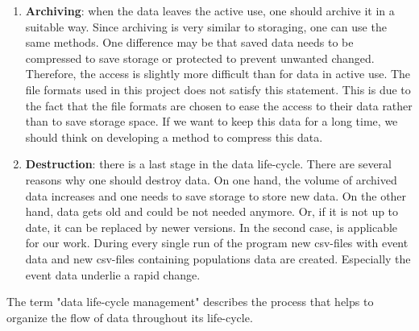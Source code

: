 \begin{enumerate}
	\item \textbf{Archiving}: when the data leaves the active use, one should archive it in a suitable way. Since archiving is very similar to storaging, one can use the same methods. One difference may be that saved data needs to be compressed to save storage or protected to prevent unwanted changed. Therefore, the access is slightly more difficult than for data in active use. The file formats used in this project does not satisfy this statement. This is due to the fact that the file formats are chosen to ease the access to their data rather than to save storage space. If we want to keep this data for a long time, we should think on developing a method to compress this data.
	\item \textbf{Destruction}:  there is a last stage in the data life-cycle. There are several reasons why one should destroy data. On one hand, the volume of archived data increases and one needs to save storage to store new data. On the other hand, data gets old and could be not needed anymore. Or, if it is not up to date, it can be replaced by newer versions. In the second case, is applicable for our work. During every single run of the program new csv-files with event data and new csv-files containing populations data are created. Especially the event data underlie a rapid change.
\end{enumerate}

The term "data life-cycle management" describes the process that helps to organize the flow of data throughout its life-cycle.